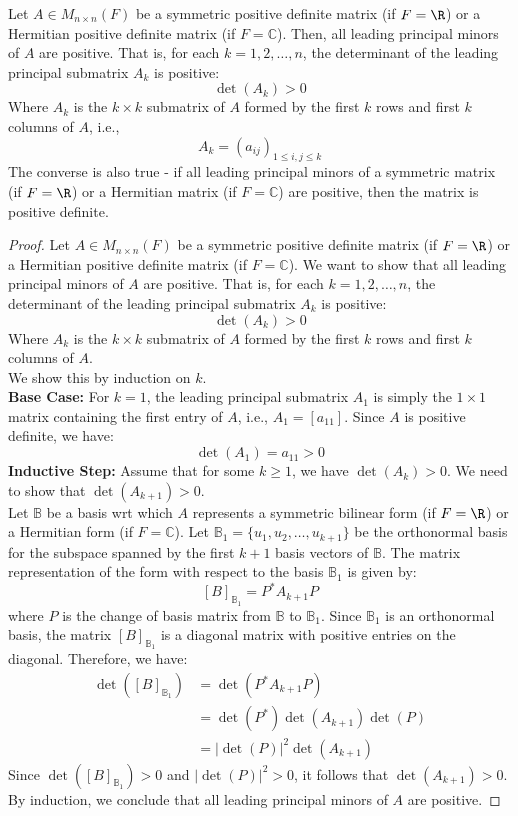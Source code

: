 \documentclass[openany]{book}
\renewcommand{\C}{\mathbb{C}}
\begin{document}
\begin{mytheorem}
    Let $A \in M_{n \times n}(F)$ be a symmetric positive definite matrix (if $F = \R$) or a Hermitian positive definite matrix (if $F = \C$). Then, all leading principal minors of $A$ are positive. That is, for each $k = 1, 2, \ldots, n$, the determinant of the leading principal submatrix $A_k$ is positive:
    $$\det(A_k) > 0$$
    Where $A_k$ is the $k \times k$ submatrix of $A$ formed by the first $k$ rows and first $k$ columns of $A$, i.e., 
    $$A_k = (a_{ij})_{1 \leq i,j \leq k}$$
    The converse is also true - if all leading principal minors of a symmetric matrix (if $F = \R$) or a Hermitian matrix (if $F = \C$) are positive, then the matrix is positive definite.
\end{mytheorem}
\begin{proof}
Let $A \in M_{n \times n}(F)$ be a symmetric positive definite matrix (if $F = \R$) or a Hermitian positive definite matrix (if $F = \C$). We want to show that all leading principal minors of $A$ are positive. That is, for each $k = 1, 2, \ldots, n$, the determinant of the leading principal submatrix $A_k$ is positive:
$$\det(A_k) > 0$$
Where $A_k$ is the $k \times k$ submatrix of $A$ formed by the first $k$ rows and first $k$ columns of $A$. \\
We show this by induction on $k$. \\
\textbf{Base Case:} For $k = 1$, the leading principal submatrix $A_1$ is simply the $1 \times 1$ matrix containing the first entry of $A$, i.e., $A_1 = [a_{11}]$. Since $A$ is positive definite, we have:
$$\det(A_1) = a_{11} > 0$$
\textbf{Inductive Step:} Assume that for some $k \geq 1$, we have $\det(A_k) > 0$. We need to show that $\det(A_{k+1}) > 0$. \\
Let $\mathbb{B}$ be a basis wrt which $A$ represents a symmetric bilinear form (if $F = \R$) or a Hermitian form (if $F = \C$). Let $\mathbb{B}_1 = \{u_1, u_2, \ldots, u_{k+1}\}$ be the orthonormal basis for the subspace spanned by the first $k+1$ basis vectors of $\mathbb{B}$. The matrix representation of the form with respect to the basis $\mathbb{B}_1$ is given by:
$$[B]_{\mathbb{B}_1} = P^* A_{k+1} P$$
where $P$ is the change of basis matrix from $\mathbb{B}$ to $\mathbb{B}_1$. Since $\mathbb{B}_1$ is an orthonormal basis, the matrix $[B]_{\mathbb{B}_1}$ is a diagonal matrix with positive entries on the diagonal. Therefore, we have:
\[\begin{aligned}
\det([B]_{\mathbb{B}_1}) &= \det(P^* A_{k+1} P) \\
&= \det(P^*) \det(A_{k+1}) \det(P) \\
&= |\det(P)|^2 \det(A_{k+1})
\end{aligned}\]
Since $\det([B]_{\mathbb{B}_1}) > 0$ and $|\det(P)|^2 > 0$, it follows that $\det(A_{k+1}) > 0$. \\
By induction, we conclude that all leading principal minors of $A$ are positive.
\end{proof}
\end{document}
